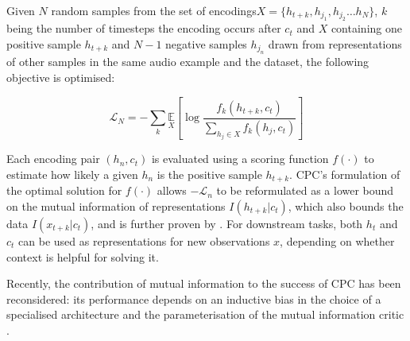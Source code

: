 Given $N$ random samples from the set of encodings\linebreak $X = \{h_{t+k}, h_{j_1}, h_{j_2} \hdots h_N\}$, $k$ being the number of timesteps the encoding occurs after $c_t$ and $X$ containing one positive sample $h_{t+k}$ and $N-1$ negative samples $h_{j_{n}}$ drawn from representations of other samples in the same audio example and the dataset, the following objective is optimised:

\begin{equation}
    \mathcal{L}_{N}=-\sum_{k} \underset{X}{\mathbb{E}}\left[\log \frac{f_{k}\left(h_{t+k}, c_{t}\right)}{\sum_{h_{j} \in X} f_{k}\left(h_{j}, c_{t}\right)}\right]
\end{equation}

Each encoding pair $(h_n, c_t)$ is evaluated using a scoring function $f(\cdot)$ to estimate how likely a given $h_n$ is the positive sample $h_{t+k}$.
CPC's formulation of the optimal solution for $f(\cdot)$ allows $-\mathcal{L}_n$ to be reformulated as a lower bound on the mutual information of representations $I(h_{t+k} | c_t)$, which also bounds the data $I(x_{t+k} | c_t)$, and is further proven by \cite{poole_variational_2019}.
For downstream tasks, both $h_t$ and $c_t$ can be used as representations for new observations $x$, depending on whether context is helpful for solving it.

Recently, the contribution of mutual information to the success of CPC has been reconsidered: its performance depends on an inductive bias in the choice of a specialised architecture and the parameterisation of the mutual information critic \cite{Tschannen2020OnMI}.



